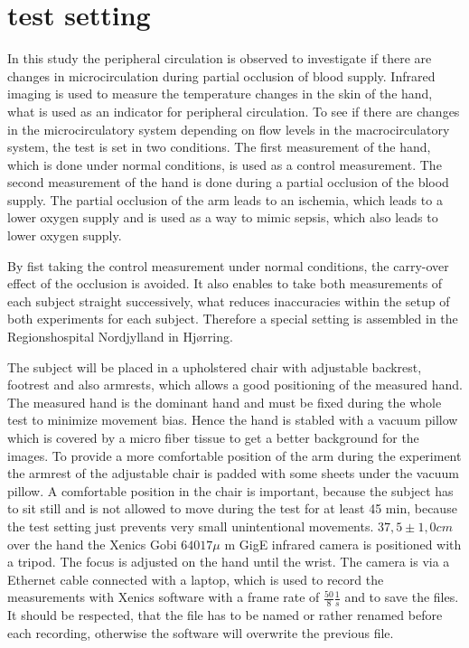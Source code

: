 \chapter{test setting}
In this study the peripheral circulation is observed to investigate if there are changes in microcirculation during partial occlusion of blood supply. Infrared imaging is used to measure the temperature changes in the skin of the hand, what is used as an indicator for peripheral circulation. 
To see if there are changes in the microcirculatory system depending on flow levels in the macrocirculatory system, the test is set in two conditions. The first measurement of the hand, which is done under normal conditions, is used as a control measurement. The second measurement of the hand is done during a partial occlusion of the blood supply. The partial occlusion of the arm leads to an ischemia, which leads to a lower oxygen supply and is used as a way to mimic sepsis, which also leads to lower oxygen supply. 

By fist taking the control measurement under normal conditions, the carry-over effect of the occlusion is avoided. It also enables to take both measurements of each subject straight successively, what reduces inaccuracies within the setup of both experiments for each subject. Therefore a special setting is assembled in the Regionshospital Nordjylland in Hj\o{}rring.

The subject will be placed in a upholstered chair with adjustable backrest, footrest and also armrests, which allows a good positioning of the measured hand. The measured hand is the dominant hand and must be fixed during the whole test to minimize movement bias. Hence the hand is stabled with a vacuum pillow which is covered by a micro fiber tissue to get a better background for the images. To provide a more comfortable position of the arm during the experiment the armrest of the adjustable chair is padded with some sheets under the vacuum pillow. A comfortable position in the chair is important, because the subject has to sit still and is not allowed to move during the test for at least 45 min, because the test setting just prevents very small unintentional movements.
$37,5\pm 1,0 cm$ over the hand the Xenics Gobi $640 17\mu$ m GigE infrared camera is positioned with a tripod. The focus is adjusted on the hand until the wrist.
The camera is via a Ethernet cable connected with a laptop, which is used to record the measurements with Xenics software with a frame rate of $ \frac{50}{8} \frac{1}{s} $ and to save the files. It should be respected, that the file has to be named or rather renamed before each recording, otherwise the software will overwrite the previous file.

